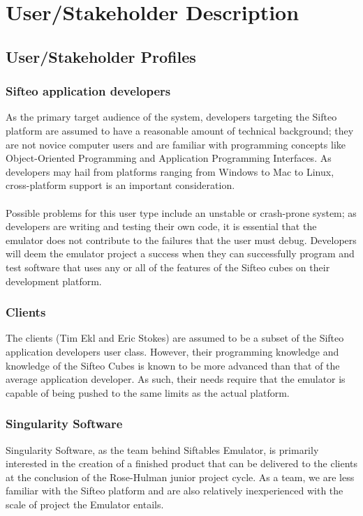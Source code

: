 \documentclass[12pt]{article}
\begin{document}
\section{User/Stakeholder Description}

               \subsection{User/Stakeholder Profiles}

                          \subsubsection{Sifteo application developers}
                          As the primary target audience of the system, developers targeting the Sifteo platform are assumed to have a reasonable amount of technical background; they are not novice computer users and are familiar with programming concepts like Object-Oriented Programming and Application Programming Interfaces. As developers may hail from platforms ranging from Windows to Mac to Linux, cross-platform support is an important consideration.\\\\
                          Possible problems for this user type include an unstable or crash-prone system; as developers are writing and testing their own code, it is essential that the emulator does not contribute to the failures that the user must debug. Developers will deem the emulator project a success when they can successfully program and test software that uses any or all of the features of the Sifteo cubes on their development platform.

                          \subsubsection{Clients}
                          The clients (Tim Ekl and Eric Stokes) are assumed to be a subset of the Sifteo application developers user class. However, their programming knowledge and knowledge of the Sifteo Cubes is known to be more advanced than that of the average application developer. As such, their needs require that the emulator is capable of being pushed to the same limits as the actual platform.

                          \subsubsection{Singularity Software}
                          Singularity Software, as the team behind Siftables Emulator, is primarily interested in the creation of a finished product that can be delivered to the clients at the conclusion of the Rose-Hulman junior project cycle. As a team, we are less familiar with the Sifteo platform and are also relatively inexperienced with the scale of project the Emulator entails.
\end{document}
